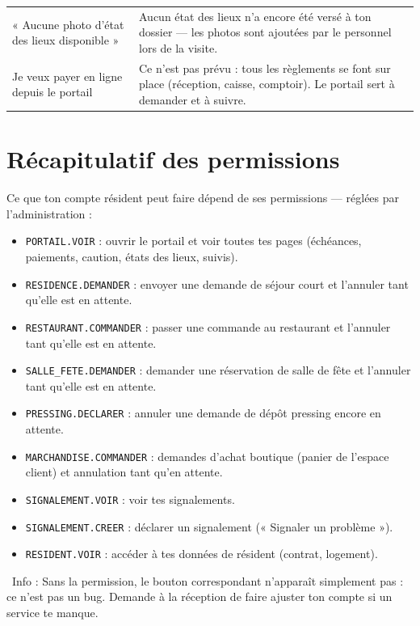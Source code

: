\documentclass[12pt,a4paper]{article}
\newcommand{\info}[1]{\par\noindent\textcolor{lagoon}{\faInfoCircle\ Info : #1}\par}
\begin{document}
\begin{longtable}{>{\raggedright}p{5cm} p{9cm}}
« Aucune photo d'état des lieux disponible » & Aucun état des lieux n'a encore été versé à ton dossier — les photos sont ajoutées par le personnel lors de la visite. \\

Je veux payer en ligne depuis le portail & Ce n'est pas prévu : tous les règlements se font sur place (réception, caisse, comptoir). Le portail sert à demander et à suivre. \\

\bottomrule
\end{longtable}

\newpage

\section{Récapitulatif des permissions}

Ce que ton compte résident peut faire dépend de ses permissions — réglées par l'administration :

\begin{itemize}[label=\textcolor{lagoon}{\faKey}]
  \item \texttt{PORTAIL.VOIR} : ouvrir le portail et voir toutes tes pages (échéances, paiements, caution, états des lieux, suivis).
  \item \texttt{RESIDENCE.DEMANDER} : envoyer une demande de séjour court et l'annuler tant qu'elle est en attente.
  \item \texttt{RESTAURANT.COMMANDER} : passer une commande au restaurant et l'annuler tant qu'elle est en attente.
  \item \texttt{SALLE\_FETE.DEMANDER} : demander une réservation de salle de fête et l'annuler tant qu'elle est en attente.
  \item \texttt{PRESSING.DECLARER} : annuler une demande de dépôt pressing encore en attente.
  \item \texttt{MARCHANDISE.COMMANDER} : demandes d'achat boutique (panier de l'espace client) et annulation tant qu'en attente.
  \item \texttt{SIGNALEMENT.VOIR} : voir tes signalements.
  \item \texttt{SIGNALEMENT.CREER} : déclarer un signalement (« Signaler un problème »).
  \item \texttt{RESIDENT.VOIR} : accéder à tes données de résident (contrat, logement).
\end{itemize}

\info{Sans la permission, le bouton correspondant n'apparaît simplement pas : ce n'est pas un bug. Demande à la réception de faire ajuster ton compte si un service te manque.}

\vfill

\begin{center}
\end{center}
\end{document}
